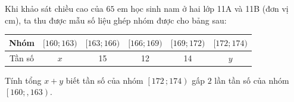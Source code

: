 \begin{bt}%

	Khi khảo sát chiều cao của $65$ em học sinh nam ở hai lớp 11A và 11B (đơn vị cm), ta thu được mẫu số liệu ghép nhóm được cho bảng sau:
	\begin{center}
		\begin{tabular}{|c|c|c|c|c|c|}
			\hline
			Nhóm & $[160; 163)$ & $[163; 166)$ &$[166; 169)$ &$[169; 172)$ & $[172; 174)$\\
			\hline
			Tần số & $x$ & 15 & 12 & 14 & $y$\\
			\hline
		\end{tabular}
	\end{center}
	Tính tổng $x+y$ biết tần số của nhóm $\left[ 172\,;174 \right)$ gấp $2$ lần tần số của nhóm $\left[ 160;,163 \right)$.
	
\end{bt}

